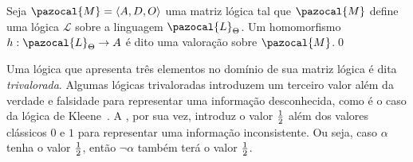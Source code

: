         \begin{definicao}[Valoração]
            Seja $\pazocal{M} = \langle A, D, O \rangle$ uma matriz lógica tal que $\pazocal{M}$ define uma lógica $\mathcal{L}$ sobre a linguagem $\pazocal{L}_{\Theta}$. Um homomorfismo $h : \pazocal{L}_{\Theta} \to A$ é dito uma valoração sobre $\pazocal{M}$.\qed{}
        \end{definicao}


       Uma lógica que apresenta três elementos no domínio de sua matriz lógica é dita \textit{trivalorada}. Algumas lógicas trivaloradas introduzem um terceiro valor além da verdade e falsidade para representar uma informação desconhecida, como é o caso da lógica de Kleene~\cite{manyvalued}. A \lfium{}, por sua vez, introduz o valor $\frac{1}{2}{}$ além dos valores clássicos $0$ e $1$ para representar uma informação inconsistente. Ou seja, caso $\alpha$ tenha o valor $\frac{1}{2}{}$, então $\neg \alpha$ também terá o valor $\frac{1}{2}{}$.

